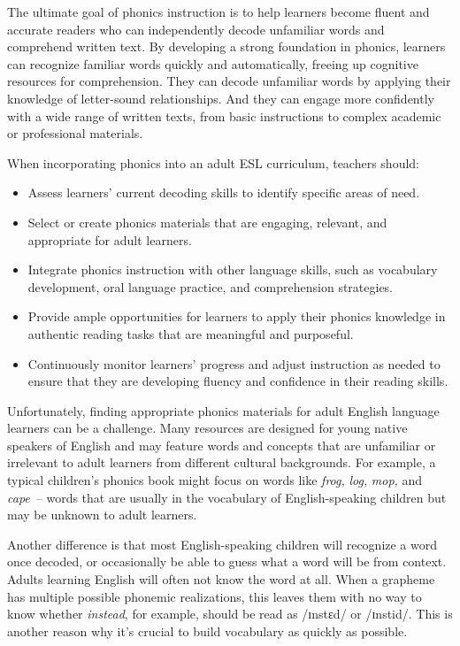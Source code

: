 The ultimate goal of phonics instruction is to help learners become fluent and accurate readers who can independently decode unfamiliar words and comprehend written text. By developing a strong foundation in phonics, learners can recognize familiar words quickly and automatically, freeing up cognitive resources for comprehension. They can decode unfamiliar words by applying their knowledge of letter-sound relationships. And they can engage more confidently with a wide range of written texts, from basic instructions to complex academic or professional materials.

When incorporating phonics into an adult ESL curriculum, teachers should:

\begin{itemize}[noitemsep]
    \item Assess learners' current decoding skills to identify specific areas of need.
    \item Select or create phonics materials that are engaging, relevant, and appropriate for adult learners.
    \item Integrate phonics instruction with other language skills, such as vocabulary development, oral language practice, and comprehension strategies.
    \item Provide ample opportunities for learners to apply their phonics knowledge in authentic reading tasks that are meaningful and purposeful.
    \item Continuously monitor learners' progress and adjust instruction as needed to ensure that they are developing fluency and confidence in their reading skills.
\end{itemize}

Unfortunately, finding appropriate phonics materials for adult English language learners can be a challenge. Many resources are designed for young native speakers of English and may feature words and concepts that are unfamiliar or irrelevant to adult learners from different cultural backgrounds. For example, a typical children's phonics book might focus on words like \textit{frog,} \textit{log,} \textit{mop,} and \textit{cape}~-- words that are usually in the vocabulary of English-speaking children but may be unknown to adult learners.

Another difference is that most English-speaking children will recognize a word once decoded, or occasionally be able to guess what a word will be from context. Adults learning English will often not know the word at all. When a grapheme has multiple possible phonemic realizations, this leaves them with no way to know whether \textit{instead}, for example, should be read as /ɪnstɛd/ or /ɪnstid/. This is another reason why it's crucial to build vocabulary as quickly as possible.

